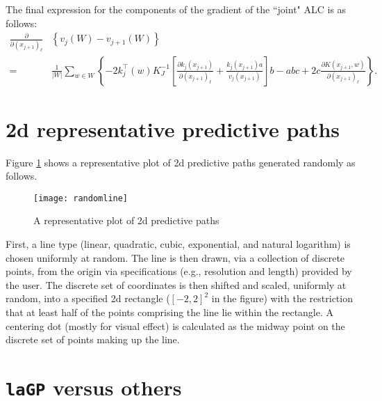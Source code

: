 \documentclass[12pt]{article}
\begin{document}
The final expression for the components of the gradient of the ``joint" ALC is as follows:
\begin{align}
\frac{\partial}{\partial (x_{j+1})_\ell} &
\left\{v_j(W) - v_{j+1}(W)\right\} \nonumber \\
=&\frac{1}{|W|}\sum_{w \in W} \left\{-2k^\top_j(w)K^{-1}_J\left[ \frac{\partial k_j (x_{j+1}) }{\partial (x_{j+1})_\ell}  + \frac{ k_j (x_{j+1}) a}{v_j(x_{j+1})} \right]b-abc + 
2 c \frac{\partial K(x_{j+1}, w)}{\partial (x_{j+1})_\ell}\right\}.\nonumber
\end{align}

\section{2d representative predictive paths}
\label{sec:rpp}

Figure \ref{f:rpp} shows a representative plot of 2d predictive paths
generated randomly as follows. 
\begin{figure}[ht!]
\centering
\texttt{[image: randomline]}\vspace{-0.2cm}
\caption{A representative plot of 2d predictive paths}
\label{f:rpp}
\end{figure}
First, a line type (linear, quadratic, cubic,
exponential, and natural logarithm) is chosen uniformly at random.
The line is then drawn, via a collection of discrete points, from the origin
via specifications (e.g., resolution and length) provided by the user.   The
discrete set of coordinates is then shifted and scaled, uniformly at random,
into a specified 2d rectangle ($[-2,2]^2$ in the figure) with the restriction
that at least half of the points comprising the line lie within the rectangle.  
A centering dot (mostly for visual effect) is calculated 
as the midway point on the discrete set of points making up the line.

\section{{\tt laGP} versus others}
\label{sec:rgasp}
\end{document}
